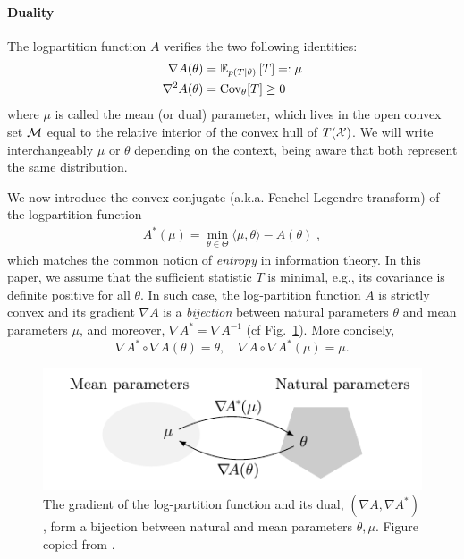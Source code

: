 \documentclass[twoside]{article}
\newcommand*{\expect}[2][]{\ensuremath{\mathbb{E}_{#1} \left[ #2 \right] }} %
\newcommand{\logpart}{A}
\newcommand{\conj}{\logpart^*}
\newcommand{\nat}{\theta}
\newcommand{\m}{\mu}
\newcommand{\meanp}{\m}
\begin{document}
\paragraph{Duality}
The logpartition function $\logpart$ verifies the two following identities:
\begin{align}
    \nabla\logpart(\nat) &=  \expect[p(T|\nat)]{T} =: \meanp \\
    \nabla^2 \logpart(\nat) &= \Cov_\nat[T] \geq 0
\end{align}
where $\meanp$ is called the mean (or dual) parameter, which lives in the open convex set ${\mathcal M}$ equal to the relative interior of the convex hull of $T({\mathcal X})$.
We will write interchangeably $\m$ or  $\nat$ depending on the context, being aware that both represent the same distribution.

We now introduce the convex conjugate (a.k.a. Fenchel-Legendre transform) of the logpartition function
\begin{align}
	\conj(\m) = \min_{\nat\in\Theta}\langle \m, \nat \rangle - \logpart(\nat) \; ,
\end{align}
which matches the common notion of \textit{entropy} in information theory. In this paper, we assume that the sufficient statistic $T$ is minimal, e.g., its covariance is definite positive for all $\nat$. In such case, the log-partition function $\logpart$ is strictly convex and its gradient $\nabla \logpart$ is a \textit{bijection} between natural parameters $\nat$ and mean parameters $\m$, and moreover, $\nabla\conj=\nabla\logpart^{-1}$ (cf Fig.~\ref{fig:duality}). More concisely,
\[
	\nabla\conj \circ \nabla\logpart(\nat) = \nat, \quad \nabla\logpart\circ \nabla\conj(\meanp) = \meanp.
\]


\begin{figure}[t] %
	\centering
	\includegraphics{duality}
	\caption{The gradient of the log-partition function and its dual, $(\nabla \logpart, \nabla \conj)$, form a bijection between natural and mean parameters $\nat, \meanp$. Figure copied from \citet{kunstner2020homeomorphic}. %
	}
	\label{fig:duality}
\end{figure}
\end{document}
